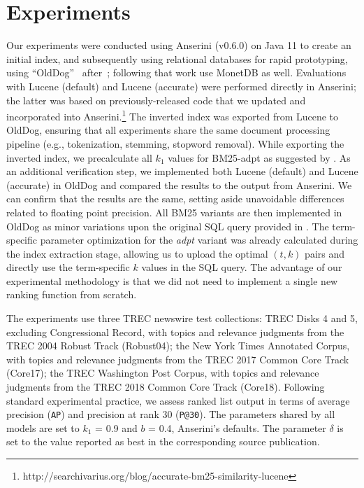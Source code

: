 \section{Experiments}
Our experiments were conducted using Anserini (v0.6.0) on Java 11 to create
an initial index, and subsequently using relational databases for rapid prototyping, using ``OldDog''~\citep{olddog-docker} after~\citet{OldDog}; following that work use MonetDB as well. Evaluations with Lucene (default) and Lucene (accurate) were performed directly in Anserini; the latter was based on previously-released code that we updated and incorporated into Anserini.\footnote{http://searchivarius.org/blog/accurate-bm25-similarity-lucene} The inverted index was exported from Lucene to OldDog, ensuring that all experiments share the same document processing pipeline (e.g., tokenization, stemming, stopword removal). While exporting the inverted index, we precalculate all $k_1$ values for BM25-adpt as suggested by \citet{bm25-adpt}. As an additional verification step, we implemented both Lucene (default) and Lucene (accurate) in OldDog and compared the results to the output from Anserini. We can confirm that the results are the same, setting aside unavoidable differences related to floating point precision. All BM25 variants are then implemented in OldDog as minor variations upon the original SQL query provided in \citeauthor{OldDog}. The term-specific parameter optimization for the \emph{adpt} variant was already calculated during the index extraction stage, allowing us to upload the optimal $(t, k)$ pairs and directly use the term-specific $k$ values in the SQL query. The advantage of our experimental methodology is that we did not need to implement a single new ranking function from scratch. %

The experiments use three TREC newswire test collections: TREC Disks 4 and 5, excluding Congressional Record, with topics and relevance judgments from the TREC 2004 Robust Track (Robust04); the New York Times Annotated Corpus, with topics and relevance judgments from the TREC 2017 Common Core Track (Core17); the TREC Washington Post Corpus, with topics and relevance judgments from the TREC 2018 Common Core Track (Core18). Following standard experimental practice, we assess ranked list output in terms of average precision (\texttt{AP}) and precision at rank 30 (\texttt{P@30}). The parameters shared by all models are set to $k_1$ = 0.9 and $b$ = 0.4, Anserini’s defaults. The parameter $\delta$ is set to the value reported as best in the corresponding source publication. 

